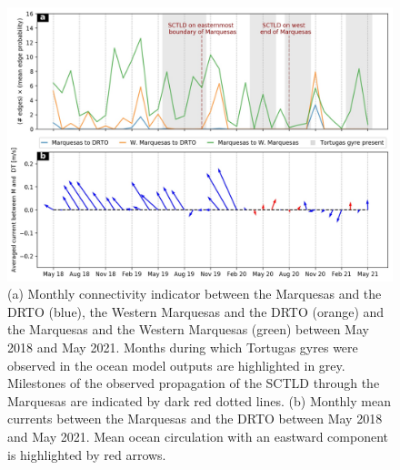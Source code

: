 \begin{figure}
    \centering
    \includegraphics[width=.9\textwidth]{chapters/drto/figures/fig2.jpg}
    \caption{(a) Monthly connectivity indicator between the Marquesas and the DRTO (blue), the Western Marquesas and the DRTO (orange) and the Marquesas and the Western Marquesas (green) between May 2018 and May 2021. Months during which Tortugas gyres were observed in the ocean model outputs are highlighted in grey. Milestones of the observed propagation of the SCTLD through the Marquesas are indicated by dark red dotted lines. (b) Monthly mean currents between the Marquesas and the DRTO between May 2018 and May 2021. Mean ocean circulation with an eastward component is highlighted by red arrows.}
    \label{fig:fig2_drto}
\end{figure}

